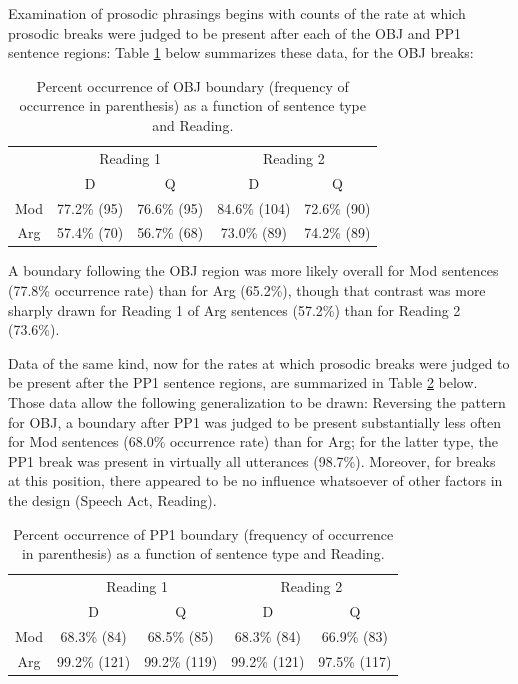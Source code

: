 \documentclass[11pt,oneside]{book}
\begin{document}
Examination of prosodic phrasings begins with counts of the rate at which prosodic breaks were judged to be present after each of the OBJ and PP1 sentence regions: Table \ref{tab:obj} below summarizes these data, for the OBJ breaks:

\begin{table}[!h]

\caption{\label{tab:obj}Percent occurrence of OBJ boundary (frequency of occurrence in parenthesis) as a function of sentence type and Reading.}
\centering
\begin{tabular}{ccccc}
\toprule
\multicolumn{1}{c}{ } & \multicolumn{2}{c}{Reading 1} & \multicolumn{2}{c}{Reading 2} \\
\cmidrule(l{3pt}r{3pt}){2-3} \cmidrule(l{3pt}r{3pt}){4-5}
 & D & Q & D & Q\\
\midrule
Mod & 77.2\% (95) & 76.6\% (95) & 84.6\% (104) & 72.6\% (90)\\
Arg & 57.4\% (70) & 56.7\% (68) & 73.0\% (89) & 74.2\% (89)\\
\bottomrule
\end{tabular}
\end{table}

A boundary following the OBJ region was more likely overall for Mod sentences (77.8\% occurrence rate) than for Arg (65.2\%), though that contrast was more sharply drawn for Reading 1 of Arg sentences (57.2\%) than for Reading 2 (73.6\%).

Data of the same kind, now for the rates at which prosodic breaks were judged to be present after the PP1 sentence regions, are summarized in Table \ref{tab:pp1} below. Those data allow the following generalization to be drawn: Reversing the pattern for OBJ, a boundary after PP1 was judged to be present substantially less often for Mod sentences (68.0\% occurrence rate) than for Arg; for the latter type, the PP1 break was present in virtually all utterances (98.7\%). Moreover, for breaks at this position, there appeared to be no influence whatsoever of other factors in the design (Speech Act, Reading).

\begin{table}[!h]

\caption{\label{tab:pp1}Percent occurrence of PP1 boundary (frequency of occurrence in parenthesis) as a function of sentence type and Reading.}
\centering
\begin{tabular}{ccccc}
\toprule
\multicolumn{1}{c}{ } & \multicolumn{2}{c}{Reading 1} & \multicolumn{2}{c}{Reading 2} \\
\cmidrule(l{3pt}r{3pt}){2-3} \cmidrule(l{3pt}r{3pt}){4-5}
 & D & Q & D & Q\\
\midrule
Mod & 68.3\% (84) & 68.5\% (85) & 68.3\% (84) & 66.9\% (83)\\
Arg & 99.2\% (121) & 99.2\% (119) & 99.2\% (121) & 97.5\% (117)\\
\bottomrule
\end{tabular}
\end{table}
\end{document}
